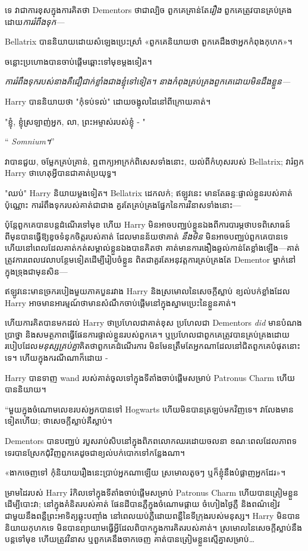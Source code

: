 {{{ទេ វាជាការខុសក្នុងការគិតថា Dementors ថាជាល្បិច ពួកគេគ្រាន់តែ\emph{រឿង} ពួកគេត្រូវបានគ្រប់គ្រងដោយ\emph{ការរំពឹងទុក—}

Bellatrix បាន​និយាយ​ដោយ​សំឡេង​ប្រេះស្រាំ «ពួកគេ​និយាយ​ថា ពួកគេ​ដឹង​ថា​អ្នក​កំពុង​កុហក»។

ចន្លោះប្រហោងបានចាប់ផ្តើមឆ្ពោះទៅមុខម្តងទៀត។

\emph{ការរំពឹងទុករបស់នាងគឺជឿជាក់ខ្លាំងជាងខ្ញុំទៅទៀត។ នាងកំពុងគ្រប់គ្រងពួកគេដោយមិនដឹងខ្លួន—}

Harry បាននិយាយថា "កុំទប់ទល់" ដោយចង្អុលដៃនៅពីក្រោយគាត់។

"ខ្ញុំ, ខ្ញុំស្រឡាញ់អ្នក, លា, ព្រះអម្ចាស់របស់ខ្ញុំ - "

“\emph{ Somnium។}”

វាបានជួយ, ចម្លែកគ្រប់គ្រាន់, ឮពាក្យអាក្រក់ពិសេសទាំងនោះ, យល់ពីកំហុសរបស់ Bellatrix; វារំឭក Harry ថាហេតុអ្វីបានជាគាត់ប្រយុទ្ធ។

"ឈប់" Harry និយាយម្តងទៀត។ Bellatrix ដេកលក់; ឥឡូវនេះ មានតែឆន្ទៈផ្ទាល់ខ្លួនរបស់គាត់ប៉ុណ្ណោះ ការរំពឹងទុករបស់គាត់ជាជាង គួរតែគ្រប់គ្រងផ្នែកនៃការវិនាសទាំងនោះ—

ប៉ុន្តែពួកគេបានបន្តដំណើរទៅមុខ ហើយ Harry មិនអាចបញ្ឈប់ខ្លួនឯងពីការបារម្ភថាបទពិសោធន៍ពីមុនបានធ្វើឱ្យខូចទំនុកចិត្តរបស់គាត់ ដែលមានន័យថាគាត់ \emph{នឹងមិន} មិនអាចបញ្ឈប់ពួកគេបានទេ ហើយនៅពេលដែលគាត់កត់សម្គាល់ខ្លួនឯងបានគិតថា គាត់មានការងឿងឆ្ងល់កាន់តែខ្លាំងឡើង—គាត់ត្រូវការពេលវេលាបន្ថែមទៀតដើម្បីរៀបចំខ្លួន ពិតជាគួរតែអនុវត្តការគ្រប់គ្រងតែ Dementor ម្នាក់នៅក្នុងទ្រុងជាមុនសិន—

ឥឡូវនេះមានច្រករបៀងមួយភាគបួនរវាង Harry និងស្រមោលនៃសេចក្តីស្លាប់ ខ្យល់បក់ខ្លាំងដែល Harry អាចមានអារម្មណ៍ថាមានសំណឹកចាប់ផ្តើមនៅក្នុងស្នាមប្រេះនៃខ្លួនគាត់។

ហើយការគិតបានមកដល់ Harry ថាប្រហែលជាគាត់ខុស ប្រហែលជា Dementors \emph{did} មានបំណងប្រាថ្នា និងសមត្ថភាពធ្វើផែនការផ្ទាល់ខ្លួនរបស់ពួកគេ។ ឬប្រហែលជាពួកគេត្រូវបានគ្រប់គ្រងដោយរបៀបដែល\emph{មនុស្សគ្រប់គ្នា}គិតថាពួកគេដំណើរការ មិនមែនត្រឹមតែអ្នកណាដែលនៅជិតពួកគេបំផុតនោះទេ។ ហើយក្នុងករណីណាក៏ដោយ -

Harry បានទាញ wand របស់គាត់ចូលទៅក្នុងទីតាំងចាប់ផ្តើមសម្រាប់ Patronus Charm ហើយបាននិយាយ។

“មួយក្នុងចំណោមលេខរបស់អ្នកបានទៅ Hogwarts ហើយមិនបានត្រឡប់មកវិញទេ។ វាលែងមានទៀតហើយ; ថាសេចក្តីស្លាប់គឺស្លាប់។

Dementors បានបញ្ឈប់ របួសរាប់សិបនៅក្នុងពិភពលោកឈរដោយចលនា ខណៈពេលដែលភាពទទេរបានស្រែកជុំវិញពួកគេដូចជាខ្យល់បក់បោកទៅកន្លែងណា។

«​ងាក​ចេញ​ទៅ កុំ​និយាយ​រឿង​នេះ​ប្រាប់​អ្នក​ណា​ឡើយ ស្រមោល​តូច​ៗ ឬ​ក៏​ខ្ញុំ​នឹង​បំផ្លាញ​អ្នក​ដែរ»។

ម្រាមដៃរបស់ Harry រំកិលទៅក្នុងទីតាំងចាប់ផ្តើមសម្រាប់ Patronus Charm ហើយបានត្រៀមខ្លួនដើម្បីបោះវា; នៅក្នុងគំនិតរបស់គាត់ ផែនដីបានភ្លឺក្នុងចំណោមផ្កាយ ចំហៀងថ្ងៃភ្លឺ និងពណ៌ខៀវជាមួយនឹងពន្លឺព្រះអាទិត្យឆ្លុះបញ្ចាំង នៅពេលយប់ភ្លឺដោយពន្លឺនៃទីក្រុងរបស់មនុស្ស។ Harry មិន​បាន​និយាយ​កុហក​ទេ មិន​បាន​ព្យាយាម​ធ្វើ​អ្វី​ដែល​ពិបាក​ក្នុង​ការ​គិត​របស់​គាត់។ ស្រមោលនៃសេចក្តីស្លាប់នឹងបន្តទៅមុខ ហើយត្រូវវិនាស ឬពួកគេនឹងចាកចេញ គាត់បានត្រៀមខ្លួនស្មើគ្នាសម្រាប់…

}}}
